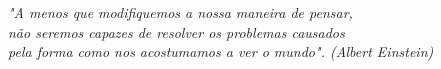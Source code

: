\begin{epigrafe}
	\vspace*{\fill}
	\begin{flushright}
		\textit{"A menos que modifiquemos a nossa maneira de pensar,\\ não seremos capazes de resolver os problemas causados \\ pela forma como nos acostumamos a ver o mundo". (Albert Einstein)}
	\end{flushright}
\end{epigrafe}